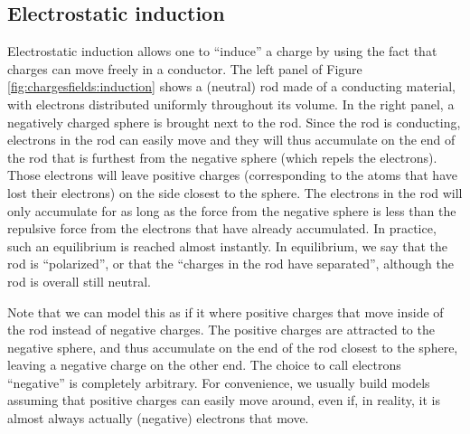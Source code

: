 
\subsection{Electrostatic induction}
Electrostatic induction allows one to ``induce'' a charge by using the fact that charges can move freely in a conductor. The left panel of Figure \ref{fig:chargesfields:induction} shows a (neutral) rod made of a conducting material, with electrons distributed uniformly throughout its volume. In the right panel, a negatively charged sphere is brought next to the rod. Since the rod is conducting, electrons in the rod can easily move and they will thus accumulate on the end of the rod that is furthest from the negative sphere (which repels the electrons). Those electrons will leave positive charges (corresponding to the atoms that have lost their electrons) on the side closest to the sphere. The electrons in the rod will only accumulate for as long as the force from the negative sphere is less than the repulsive force from the electrons that have already accumulated. In practice, such an equilibrium is reached almost instantly. In equilibrium, we say that the rod is ``polarized'', or that the ``charges in the rod have separated'', although the rod is overall still neutral.

Note that we can model this as if it where positive charges that move inside of the rod instead of negative charges. The positive charges are attracted to the negative sphere, and thus accumulate on the end of the rod closest to the sphere, leaving a negative charge on the other end. The choice to call electrons ``negative'' is completely arbitrary. For convenience, we usually build models assuming that positive charges can easily move around, even if, in reality, it is almost always actually (negative) electrons that move.


